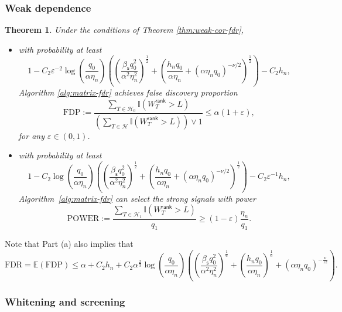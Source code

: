 \documentclass[12pt]{article}
\newcommand{\E}{\mathbb{E}}
\newcommand{\cH}{\mathcal{H}}
\newcommand{\bbI}{\mathbb{I}}
\newtheorem{Theorem}{Theorem}
\theoremstyle{plain}
\begin{document}
\subsubsection{Weak dependence}

\begin{Theorem}
	Under the conditions of Theorem \ref{thm:weak-cor-fdr},
    \begin{itemize}
\item[(a)] with probability at least   
$$
1-C_2\varepsilon^{-2}\log(\frac{q_0 }{\alpha \eta_n})\left( \left(\frac{\beta_{\mathsf{s}} q_0^2 }{ \alpha^2\eta_n^2}\right)^{\frac{1}{2}} + \left(\frac{h_n q_0}{\alpha \eta_n} +(\alpha\eta_n q_0)^{-\nu/2} \right)^{\frac{1}{2}}\right)- C_2 h_n,
$$
Algorithm \ref{alg:matrix-fdr} achieves false discovery proportion
\begin{equation}\label{eq:thm-weak-cor-fdr}
    \mathrm{FDP}:=\frac{\sum_{T\in \cH_0  } \bbI(W_T^{\mathsf{rank}} >L ) }{\left( \sum_{T\in \cH  } \bbI(W_T^{\mathsf{rank}} >L ) \right) \vee 1 } \le \alpha(1+\varepsilon),
\end{equation}
for any $\varepsilon\in(0,1)$. 
\item[(b)] with probability at least
$$
1-C_2 \log(\frac{q_0 }{\alpha \eta_n})\left( \left(\frac{\beta_{\mathsf{s}} q_0^2 }{ \alpha^2\eta_n^2}\right)^{\frac{1}{2}} + \left(\frac{h_n q_0}{\alpha \eta_n}+(\alpha\eta_n q_0)^{-\nu/2} \right)^{\frac{1}{2}}\right)- C_2 \varepsilon^{-1} h_n,
$$
Algorithm~\ref{alg:matrix-fdr} can select the strong signals with power 
\begin{equation}\label{eq:thm-weak-cor-power}
   \mathrm{POWER}:= \frac{\sum_{T\in \cH_1  } \bbI(W_T^{\mathsf{rank}} >L ) }{q_1} \ge (1-\varepsilon)\frac{\eta_n}{q_1}.
\end{equation}
\end{itemize}
\end{Theorem}

Note that Part (a) also implies that
\begin{equation}\label{eq:fdr-exp-exact}
     \text{FDR}=\E (\text{FDP})\le \alpha+ C_2h_n+C_2\alpha^{\frac{2}{3}}\log(\frac{q_0 }{\alpha \eta_n})\left( \left(\frac{\beta_{\mathsf{s}} q_0^2 }{ \alpha^2\eta_n^2}\right)^{\frac{1}{6}} + \left(\frac{h_n q_0}{\alpha \eta_n}\right)^{\frac{1}{6}} +\left(\alpha\eta_n q_0\right)^{-\frac{\nu}{12}}  \right).
\end{equation}

\subsubsection{Whitening and screening}
\end{document}
